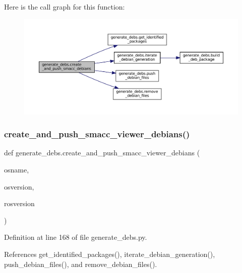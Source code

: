 Here is the call graph for this function\+:
\nopagebreak
\begin{figure}[H]
\begin{center}
\leavevmode
\includegraphics[width=350pt]{namespacegenerate__debs_af7237c463c8e5b4df369e6befc154c50_cgraph}
\end{center}
\end{figure}
\mbox{\label{namespacegenerate__debs_a9a6167ed98fbdc7b1e1c56da5652cf19}} 
\subsubsection{\texorpdfstring{create\+\_\+and\+\_\+push\+\_\+smacc\+\_\+viewer\+\_\+debians()}{create\_and\_push\_smacc\_viewer\_debians()}}
{\footnotesize\ttfamily def generate\+\_\+debs.\+create\+\_\+and\+\_\+push\+\_\+smacc\+\_\+viewer\+\_\+debians (\begin{DoxyParamCaption}\item[{}]{osname,  }\item[{}]{osversion,  }\item[{}]{rosversion }\end{DoxyParamCaption})}



Definition at line 168 of file generate\+\_\+debs.\+py.



References get\+\_\+identified\+\_\+packages(), iterate\+\_\+debian\+\_\+generation(), push\+\_\+debian\+\_\+files(), and remove\+\_\+debian\+\_\+files().



